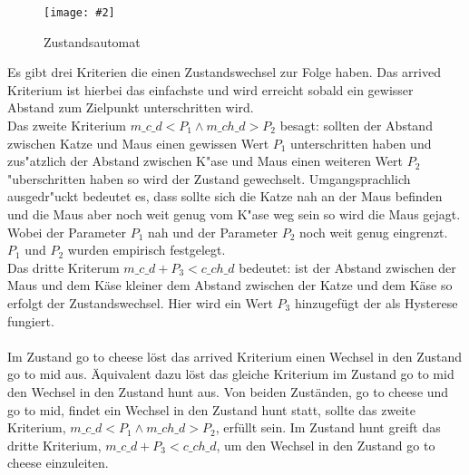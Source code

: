 \documentclass[
a4paper,     %
12pt         %
]{scrartcl}  %
\newcommand{\mygraphics}[3]{
\begin{figure}[!h]
  \begin{center}
    \texttt{[image: \#2]} \\
    \caption{#3}\label{fig:#2}
  \end{center}
\end{figure}

}
\begin{document}
\mygraphics{0.7\textwidth}{stateMachine.png}{Zustandsautomat}
Es gibt drei Kriterien die einen Zustandswechsel zur Folge haben. Das \glqq arrived\grqq{} Kriterium ist hierbei das einfachste und wird erreicht sobald ein gewisser Abstand zum Zielpunkt unterschritten wird.\\
Das zweite Kriterium \glqq$m\_c\_d < P_{1} \land  m\_ch\_d > P_{2} $\grqq{} besagt: sollten der Abstand zwischen Katze und Maus einen gewissen Wert $P_{1}$ unterschritten haben und zus"atzlich der Abstand zwischen K"ase und Maus einen weiteren Wert $P_{2}$ "uberschritten haben so wird der Zustand gewechselt. Umgangsprachlich ausgedr"uckt bedeutet es, dass sollte sich die Katze nah an der Maus befinden und die Maus aber noch weit genug vom K"ase weg sein so wird die Maus gejagt. Wobei der Parameter $P_{1}$ \glqq nah \grqq{} und der Parameter $P_{2}$ \glqq noch weit genug\grqq{} eingrenzt. $P_{1}$ und $P_{2}$ wurden empirisch festgelegt.\\
Das dritte Kriterum \glqq $m\_c\_d + P_{3} < c\_ch\_d$\grqq{} bedeutet: ist der Abstand zwischen der Maus und dem Käse kleiner dem Abstand zwischen der Katze und dem Käse so erfolgt der Zustandswechsel. Hier wird ein Wert $P_{3}$ hinzugefügt der als Hysterese fungiert.
\\\\Im Zustand \glqq go to cheese\grqq{} löst das \glqq arrived\grqq{} Kriterium einen Wechsel in den Zustand \glqq go to mid\grqq{}
aus. Äquivalent dazu löst das gleiche Kriterium im Zustand \glqq go to mid\grqq{} den Wechsel in den Zustand \glqq hunt\grqq{} aus.
Von beiden Zuständen, \glqq go to cheese\grqq{} und \glqq go to mid\grqq{}, findet ein Wechsel in den Zustand \glqq hunt\grqq{} statt, sollte das zweite Kriterium, \glqq$m\_c\_d < P_{1} \land  m\_ch\_d > P_{2} $\grqq{}, erfüllt sein. Im Zustand \glqq hunt\grqq{} greift das dritte Kriterium, \glqq $m\_c\_d + P_{3} < c\_ch\_d$\grqq{}, um den Wechsel in den Zustand \glqq go to cheese\grqq{} einzuleiten.
\end{document}
